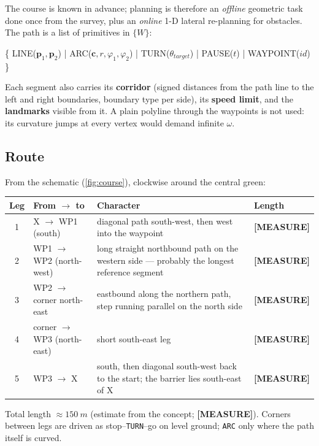 \documentclass[11pt,a4paper]{article}
\newcommand{\mk}[2]{\textsf{\scriptsize\bfseries\colorbox{#1bg}{\color{#1}[#2]}}}
\newcommand{\MEASURE}{\mk{warn}{MEASURE}}
\newcommand{\code}[1]{\texttt{\small #1}}
\newcommand{\vect}[1]{\bm{#1}}
\begin{document}
The course is known in advance; planning is therefore an \emph{offline}
geometric task done once from the survey, plus an \emph{online} 1-D lateral
re-planning for obstacles. The path is a list of primitives in $\{W\}$:
\begin{center}
\ttfamily\small
\{ LINE($\vect p_1,\vect p_2$) | ARC($\vect c, r, \varphi_1, \varphi_2$) | TURN($\theta_{target}$) | PAUSE($t$) | WAYPOINT($id$) \}
\end{center}
Each segment also carries its \textbf{corridor} (signed distances from the path
line to the left and right boundaries, boundary type per side), its
\textbf{speed limit}, and the \textbf{landmarks} visible from it. A plain
polyline through the waypoints is not used: its curvature jumps at every vertex
would demand infinite $\omega$.

\subsection{Route}

From the schematic (\cref{fig:course}), clockwise around the central green:

\begin{center}
\small
\begin{tabularx}{\textwidth}{@{}clLl@{}}
\toprule
\textbf{Leg} & \textbf{From $\to$ to} & \textbf{Character} & \textbf{Length}\\
 & X $\to$ WP1 (south) & diagonal path south-west, then west into the waypoint & \MEASURE\\
2 & WP1 $\to$ WP2 (north-west) & long straight northbound path on the western side --- probably the longest reference segment & \MEASURE\\
3 & WP2 $\to$ corner north-east & eastbound along the northern path, step running parallel on the north side & \MEASURE\\
4 & corner $\to$ WP3 (north-east) & short south-east leg & \MEASURE\\
5 & WP3 $\to$ X & south, then diagonal south-west back to the start; the barrier lies south-east of X & \MEASURE\\
\bottomrule
\end{tabularx}
\end{center}

Total length $\approx\qty{150}{m}$ (estimate from the concept; \MEASURE). Corners
between legs are driven as stop--\code{TURN}--go on level ground; \code{ARC} only
where the path itself is curved.
\end{document}

